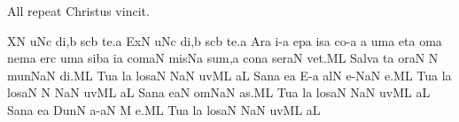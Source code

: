 \bigskip


{\itlyrics All repeat \rm Christus vincit.}


\initiumgregorianum
{}%
\sgn {}{}X\punctum N\egn
{}u\pes Nc\egn
\sgn di,\punctum b\egn
\spatium
{}s\cephalicus cb\egn
\sgn te.\punctum a\egn
\spatium
\divisiofinalis
\spatium
\sgn {}Ex\chorus\punctum N\egn
{}u\pes Nc\egn
\sgn di,\engl{}\punctum b\egn
\spatium
{}s\cephalicus cb\egn
\sgn te.\punctum a\egn
\spatium
\divisiofinalis
\spatium
\sgn {}Ar\punctum a\egn
{}i-\punctum a\egn
\sgn {}ep\punctum a\egn
\sgn {}i{s}\punctum a\egn
\sgn co-\punctum a\egn
\custos a
\lineaproxima
{}um\punctum a\egn
\spatium
\sgn {}et\punctum a\egn
\spatium
\sgn {}om\punctum a\egn
\sgn nem\punctum a\egn
\spatium
{}er\punctum c\egn
\sgn {}um\punctum a\egn
\spatium
\sgn sib\punctum a\egn
\sgn {}i{}\punctum a\egn
\spatium
\sgn com\cephalicus aN\egn
\sgn mis\pes Na\egn
\sgn su{m,}\punctum a\egn
\spatium
\sgn con\punctum a\egn
\sgn ser\cephalicus aN\egn
\sgn ve{t.}\engl{~}\clivis ML\egn
\spatium
\divisiofinalis
\spatium
\sgn Sa{lv}\punctum a\egn
{}t\punctum a\egn
\sgn {}or\clivis aN\egn
\spatium
\custos N
\lineaproxima
\sgn m{u}n\torculusdeminutus NaN\egn
\sgn di.\clivis ML\egn
\spatium
\divisiofinalis
\spatium
\sgn Tu{}\chorus\punctum a\egn
\spatium
{}l\punctum a\egn
\sgn los\cephalicus aN\egn
\spatium
{}\torculusdeminutus NaN\egn
\sgn {}uv\clivis ML\egn
\sgn {}a{}\punctum L\egn
\spatium
\divisiofinalis
\spatium
\sgn S{a}n\cantores\punctum a\egn
{}e{}\punctum a\egn
\spatium
\sgn {}E-\punctum a\egn
\sgn {}al\punctum N\egn
{}e-\torculusdeminutus NaN\egn
{}e.\clivis ML\egn
\spatium
\divisiofinalis
\spatium
\sgn Tu{}\chorus\punctum a\egn
\spatium
{}l\punctum a\egn
\sgn los\cephalicus aN\egn
\spatium
\custos N
\lineaproxima
{}\torculusdeminutus NaN\egn
\sgn {}uv\clivis ML\egn
\sgn {}a{}\punctum L\egn
\spatium
\divisiofinalis
\spatium
\sgn S{a}n\cantores\punctum a\egn
{}e{}\clivis aN\egn
\spatium
{}om\torculusdeminutus NaN\egn
\sgn {}a{s.}\clivis ML\egn
\spatium
\divisiofinalis
\spatium
\sgn Tu{}\chorus\punctum a\egn
\spatium
{}l\punctum a\egn
\sgn los\cephalicus aN\egn
\spatium
{}\torculusdeminutus NaN\egn
\sgn {}uv\clivis ML\egn
\sgn {}a{}\punctum L\egn
\spatium
\divisiofinalis
\spatium
\sgn S{a}n\cantores\punctum a\egn
{}e{}\punctum a\egn
\spatium
\sgn Dun\punctum N\egn
{}a-\cephalicus aN\egn
\custos M
\lineaproxima
{}e.\clivis ML\egn
\spatium
\divisiofinalis
\spatium
\sgn Tu{}\chorus\punctum a\egn
\spatium
{}l\punctum a\egn
\sgn los\cephalicus aN\egn
\spatium
{}\torculusdeminutus NaN\egn
\sgn {}uv\clivis ML\egn
\sgn {}a{}\punctum L\egn
\spatium
\Finisgregoriana

